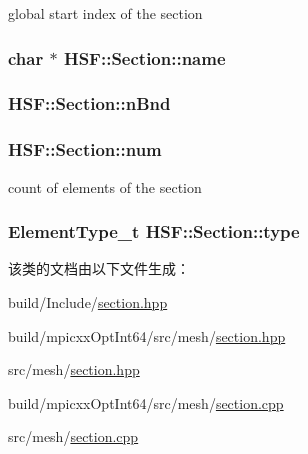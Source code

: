 global start index of the section \hypertarget{classHSF_1_1Section_a697a4c5a9aa63a9988a0e15d28ad29bd}{
\subsubsection[{name}]{\setlength{\rightskip}{0pt plus 5cm}char $\ast$ {\bf HSF::Section::name}}}
\label{classHSF_1_1Section_a697a4c5a9aa63a9988a0e15d28ad29bd}
\hypertarget{classHSF_1_1Section_aec6498be47ad3f899d20ad3a814f1a2c}{
\subsubsection[{nBnd}]{ {\bf HSF::Section::nBnd}}}
\label{classHSF_1_1Section_aec6498be47ad3f899d20ad3a814f1a2c}
\hypertarget{classHSF_1_1Section_abbaa8c9618797848a5bae1e9e41287c9}{
\subsubsection[{num}]{ {\bf HSF::Section::num}}}
\label{classHSF_1_1Section_abbaa8c9618797848a5bae1e9e41287c9}


count of elements of the section \hypertarget{classHSF_1_1Section_a7f1a7eba24b2553f6e0e3919dbf05179}{
\subsubsection[{type}]{\setlength{\rightskip}{0pt plus 5cm}ElementType\_\-t {\bf HSF::Section::type}}}
\label{classHSF_1_1Section_a7f1a7eba24b2553f6e0e3919dbf05179}


该类的文档由以下文件生成：\begin{DoxyCompactItemize}
\item 
build/Include/\hyperlink{build_2Include_2section_8hpp}{section.hpp}\item 
build/mpicxxOptInt64/src/mesh/\hyperlink{build_2mpicxxOptInt64_2src_2mesh_2section_8hpp}{section.hpp}\item 
src/mesh/\hyperlink{src_2mesh_2section_8hpp}{section.hpp}\item 
build/mpicxxOptInt64/src/mesh/\hyperlink{build_2mpicxxOptInt64_2src_2mesh_2section_8cpp}{section.cpp}\item 
src/mesh/\hyperlink{src_2mesh_2section_8cpp}{section.cpp}\end{DoxyCompactItemize}

